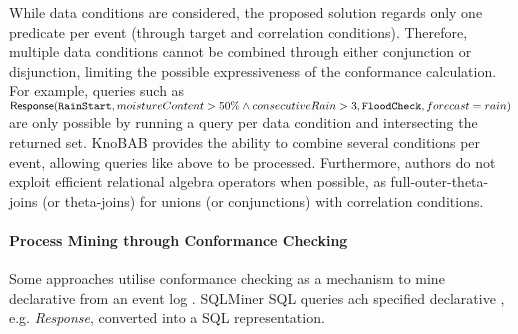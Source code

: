 While data conditions are considered, the proposed solution regards only one predicate per event (through target and correlation conditions). Therefore, multiple data conditions cannot be combined through either conjunction or disjunction, limiting the possible expressiveness of the conformance calculation. For example, queries such as 
$\textsf{Response}(\texttt{RainStart},moistureContent\\>50\% \wedge consecutiveRain>3,\texttt{FloodCheck},forecast=rain)$ 
are only possible by running a query per data condition and intersecting the returned set. KnoBAB provides the ability to combine several conditions per event, allowing queries like above to be processed. Furthermore, authors do not exploit efficient relational algebra operators when possible, as full-outer-theta-joins (or theta-joins) for unions (or conjunctions) with correlation conditions.



\paragraph*{Process Mining through Conformance Checking}
Some approaches utilise conformance checking as a mechanism to mine declarative   from an event log . SQLMiner \cite{SchonigRCJM16}  SQL queries \cite{Schonig15} ach specified declarative , e.g. \emph{Response},  converted into a SQL representation.  

